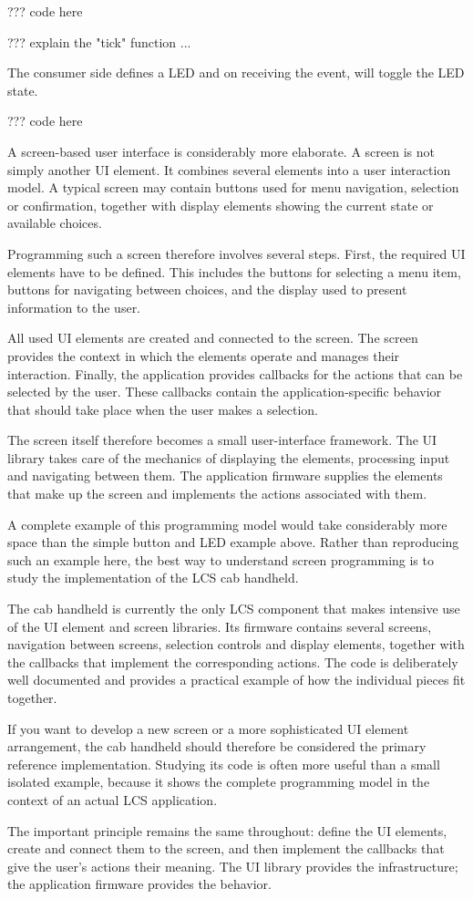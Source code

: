 ??? code here 

??? explain the "tick" function ...


The consumer side defines a LED and on receiving the event, will toggle the LED state.

 ??? code here


A screen-based user interface is considerably more elaborate. A screen is not simply another UI element. It combines several elements into a user interaction model. A typical screen may contain buttons used for menu navigation, selection or confirmation, together with display elements showing the current state or available choices.

Programming such a screen therefore involves several steps. First, the required UI elements have to be defined. This includes the buttons for selecting a menu item, buttons for navigating between choices, and the display used to present information to the user. 

All used UI elements are created and connected to the screen. The screen provides the context in which the elements operate and manages their interaction. Finally, the application provides callbacks for the actions that can be selected by the user. These callbacks contain the application-specific behavior that should take place when the user makes a selection.

The screen itself therefore becomes a small user-interface framework. The UI library takes care of the mechanics of displaying the elements, processing input and navigating between them. The application firmware supplies the elements that make up the screen and implements the actions associated with them.

A complete example of this programming model would take considerably more space than the simple button and LED example above. Rather than reproducing such an example here, the best way to understand screen programming is to study the implementation of the LCS cab handheld.

The cab handheld is currently the only LCS component that makes intensive use of the UI element and screen libraries. Its firmware contains several screens, navigation between screens, selection controls and display elements, together with the callbacks that implement the corresponding actions. The code is deliberately well documented and provides a practical example of how the individual pieces fit together.

If you want to develop a new screen or a more sophisticated UI element arrangement, the cab handheld should therefore be considered the primary reference implementation. Studying its code is often more useful than a small isolated example, because it shows the complete programming model in the context of an actual LCS application.

The important principle remains the same throughout: define the UI elements, create and connect them to the screen, and then implement the callbacks that give the user's actions their meaning. The UI library provides the infrastructure; the application firmware provides the behavior.

